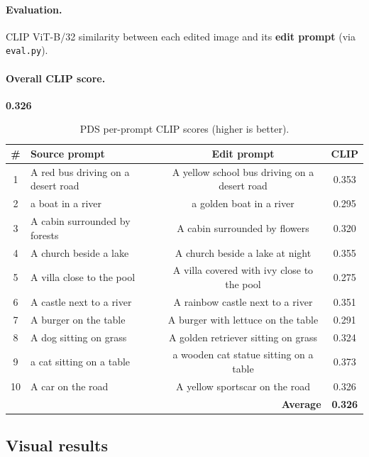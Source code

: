 \documentclass[11pt,a4paper]{article}
\begin{document}
\paragraph{Evaluation.} CLIP ViT-B/32 similarity between each edited image and its
\textbf{edit prompt} (via \texttt{eval.py}).

\paragraph{Overall CLIP score.} \textbf{0.326}

\begin{table}[H]
  \centering
  \caption{PDS per-prompt CLIP scores (higher is better).}
  \label{tab:pds-scores}
  \small
  \begin{tabular}{@{}clcc@{}}
    \toprule
    \# & Source prompt & Edit prompt & CLIP \\
    \midrule
    1  & A red bus driving on a desert road & A yellow school bus driving on a desert road & 0.353 \\
    2  & a boat in a river & a golden boat in a river & 0.295 \\
    3  & A cabin surrounded by forests & A cabin surrounded by flowers & 0.320 \\
    4  & A church beside a lake & A church beside a lake at night & 0.355 \\
    5  & A villa close to the pool & A villa covered with ivy close to the pool & 0.275 \\
    6  & A castle next to a river & A rainbow castle next to a river & 0.351 \\
    7  & A burger on the table & A burger with lettuce on the table & 0.291 \\
    8  & A dog sitting on grass & A golden retriever sitting on grass & 0.324 \\
    9  & a cat sitting on a table & a wooden cat statue sitting on a table & 0.373 \\
    10 & A car on the road & A yellow sportscar on the road & 0.326 \\
    \midrule
    \multicolumn{3}{r}{\textbf{Average}} & \textbf{0.326} \\
    \bottomrule
  \end{tabular}
\end{table}

\subsection{Visual results}
\end{document}
